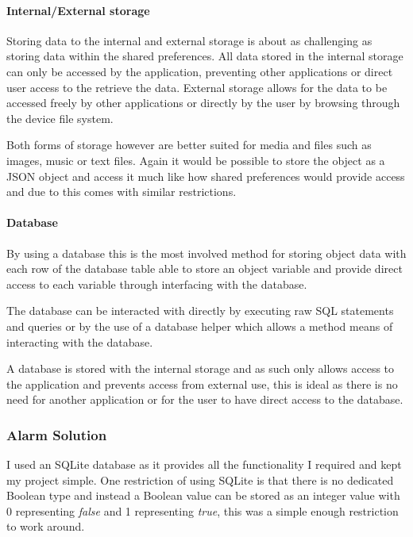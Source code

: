 \paragraph{Internal/External storage}\label{internalexternal-storage}

Storing data to the internal and external storage is about as
challenging as storing data within the shared preferences. All data
stored in the internal storage can only be accessed by the application,
preventing other applications or direct user access to the retrieve the
data. External storage allows for the data to be accessed freely by
other applications or directly by the user by browsing through the
device file system.

Both forms of storage however are better suited for media and files such
as images, music or text files. Again it would be possible to store the
object as a JSON object and access it much like how shared preferences
would provide access and due to this comes with similar restrictions.

\paragraph{Database}\label{database}

By using a database this is the most involved method for storing object
data with each row of the database table able to store an object
variable and provide direct access to each variable through interfacing
with the database.

The database can be interacted with directly by executing raw SQL
statements and queries or by the use of a database helper which allows a
method means of interacting with the database.

A database is stored with the internal storage and as such only allows
access to the application and prevents access from external use, this is
ideal as there is no need for another application or for the user to
have direct access to the database.

\subsubsection{Alarm Solution}\label{alarm-solution}

I used an SQLite database as it provides all the functionality I
required and kept my project simple. One restriction of using SQLite is
that there is no dedicated Boolean type and instead a Boolean value can
be stored as an integer value with 0 representing \emph{false} and 1
representing \emph{true}, this was a simple enough restriction to work
around.

